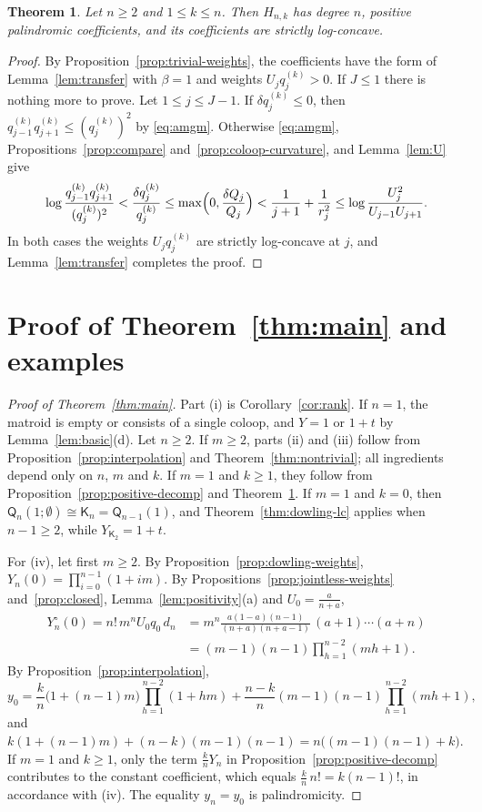 \documentclass[11pt]{amsart}
\newtheorem{theorem}{Theorem}[section]
\theoremstyle{definition}
\theoremstyle{remark}
\numberwithin{equation}{section}
\newcommand{\Q}{\mathsf{Q}}
\newcommand{\K}{\mathsf{K}}
\begin{document}
\begin{theorem}\label{thm:trivial}
Let $n\ge2$ and $1\le k\le n$. Then $H_{n,k}$ has degree $n$, positive palindromic coefficients, and its coefficients are strictly log-concave.
\end{theorem}

\begin{proof}
By Proposition~\ref{prop:trivial-weights}, the coefficients have the form of Lemma~\ref{lem:transfer} with $\beta=1$ and weights $U_jq^{(k)}_j>0$. If $J\le1$ there is nothing more to prove. Let $1\le j\le J-1$. If $\delta q^{(k)}_j\le0$, then $q^{(k)}_{j-1}q^{(k)}_{j+1}\le(q^{(k)}_j)^2$ by \eqref{eq:amgm}. Otherwise \eqref{eq:amgm}, Propositions~\ref{prop:compare} and~\ref{prop:coloop-curvature}, and Lemma~\ref{lem:U} give
\[
\log\frac{q^{(k)}_{j-1}q^{(k)}_{j+1}}{(q^{(k)}_j)^2}<\frac{\delta q^{(k)}_j}{q^{(k)}_j}\le\max\Bigl(0,\frac{\delta Q_j}{Q_j}\Bigr)<\frac1{j+1}+\frac1{r_j^2}\le\log\frac{U_j^2}{U_{j-1}U_{j+1}}.
\]
In both cases the weights $U_jq^{(k)}_j$ are strictly log-concave at $j$, and Lemma~\ref{lem:transfer} completes the proof.
\end{proof}

\section{Proof of Theorem~\ref{thm:main} and examples}\label{sec:proof}

\begin{proof}[Proof of Theorem~\textup{\ref{thm:main}}]
Part (i) is Corollary~\ref{cor:rank}. If $n=1$, the matroid is empty or consists of a single coloop, and $Y=1$ or $1+t$ by Lemma~\ref{lem:basic}(d). Let $n\ge2$. If $m\ge2$, parts (ii) and (iii) follow from Proposition~\ref{prop:interpolation} and Theorem~\ref{thm:nontrivial}; all ingredients depend only on $n$, $m$ and $k$. If $m=1$ and $k\ge1$, they follow from Proposition~\ref{prop:positive-decomp} and Theorem~\ref{thm:trivial}. If $m=1$ and $k=0$, then $\Q_n(1;\emptyset)\cong\K_n=\Q_{n-1}(1)$, and Theorem~\ref{thm:dowling-lc} applies when $n-1\ge2$, while $Y_{\K_2}=1+t$.

For (iv), let first $m\ge2$. By Proposition~\ref{prop:dowling-weights}, $Y_n(0)=\prod_{i=0}^{n-1}(1+im)$. By Propositions~\ref{prop:jointless-weights} and~\ref{prop:closed}, Lemma~\ref{lem:positivity}(a) and $U_0=\frac a{n+a}$,
\begin{align*}
Y^\circ_n(0)=n!\,m^nU_0q_0\,d_n&=m^n\frac{a(1-a)(n-1)}{(n+a)(n+a-1)}\,(a+1)\cdots(a+n)\\
&=(m-1)(n-1)\prod_{h=1}^{n-2}(mh+1).
\end{align*}
By Proposition~\ref{prop:interpolation},
\[
y_0=\frac kn\bigl(1+(n-1)m\bigr)\prod_{h=1}^{n-2}(1+hm)+\frac{n-k}n(m-1)(n-1)\prod_{h=1}^{n-2}(mh+1),
\]
and $k(1+(n-1)m)+(n-k)(m-1)(n-1)=n\bigl((m-1)(n-1)+k\bigr)$. If $m=1$ and $k\ge1$, only the term $\frac knY_n$ in Proposition~\ref{prop:positive-decomp} contributes to the constant coefficient, which equals $\frac kn\,n!=k(n-1)!$, in accordance with (iv). The equality $y_n=y_0$ is palindromicity.
\end{proof}
\end{document}
